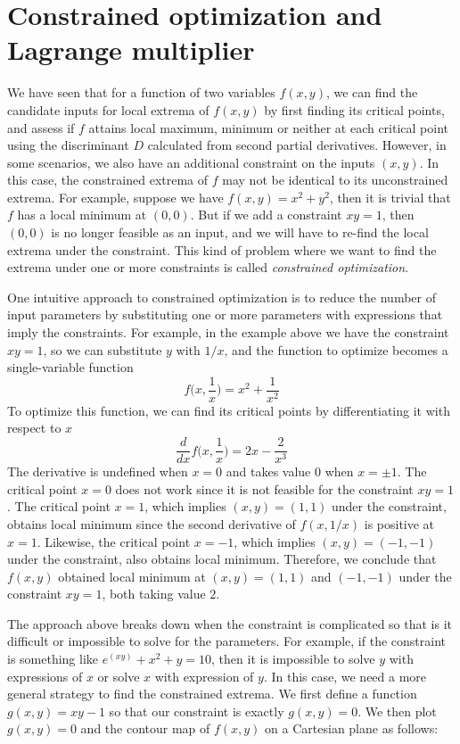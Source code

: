 \section{Constrained optimization and Lagrange multiplier}
We have seen that for a function of two variables $f(x,y)$, we can find the candidate inputs for local extrema of $f(x,y)$ by first finding its critical points, and assess if $f$ attains local maximum, minimum or neither at each critical point using the discriminant $D$ calculated from second partial derivatives.  However, in some scenarios, we also have an additional constraint on the inputs $(x,y)$.  In this case, the constrained extrema of $f$ may not be identical to its unconstrained extrema.  For example, suppose we have $f(x,y) = x^2+y^2$, then it is trivial that $f$ has a local minimum at $(0,0)$.  But if we add a constraint $xy = 1$, then $(0,0)$ is no longer feasible as an input, and we will have to re-find the local extrema under the constraint.  This kind of problem where we want to find the extrema under one or more constraints is called \textit{constrained optimization}.

One intuitive approach to constrained optimization is to reduce the number of input parameters by substituting one or more parameters with expressions that imply the constraints.  For example, in the example above we have the constraint $xy=1$, so we can substitute $y$ with $1/x$, and the function to optimize becomes a single-variable function
\[f\Big(x, \frac{1}{x}\Big) = x^2 + \frac{1}{x^2}\] 
To optimize this function, we can find its critical points by differentiating it with respect to $x$
\[\frac{d}{dx}f\Big(x, \frac{1}{x}\Big) = 2x - \frac{2}{x^3}\]
The derivative is undefined when $x = 0$ and takes value $0$ when $x = \pm 1$.  The critical point $x=0$ does not work since it is not feasible for the constraint $xy=1$.  The critical point $x=1$, which implies $(x,y) = (1,1)$ under the constraint, obtains local minimum since the second derivative of $f(x, 1/x)$ is positive at $x=1$.  Likewise, the critical point $x = -1$, which implies $(x,y) = (-1,-1)$ under the constraint, also obtains local minimum.  Therefore, we conclude that $f(x,y)$ obtained local minimum at $(x,y) = (1,1)$ and $(-1,-1)$ under the constraint $xy=1$, both taking value $2$.

The approach above breaks down when the constraint is complicated so that is it difficult or impossible to solve for the parameters.  For example, if the constraint is something like $e^(xy) + x^2 + y = 10$, then it is impossible to solve $y$ with expressions of $x$ or solve $x$ with expression of $y$.  In this case, we need a more general strategy to find the constrained extrema.  We first define a function $g(x,y) = xy -1$ so that our constraint is exactly $g(x,y) = 0$.  We then plot $g(x,y) = 0$ and the contour map of $f(x,y)$ on a Cartesian plane as follows:


